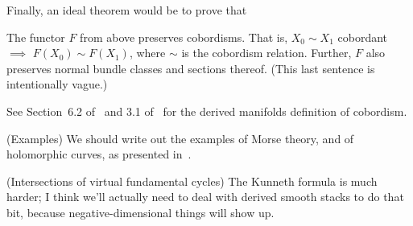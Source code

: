 				\item
					Finally, an ideal theorem would be to prove that 
					\begin{theorem}
						The functor $F$ from above preserves cobordisms. That is, $X_0 \sim X_1$ cobordant $\implies$ $F(X_0) \sim F(X_1)$, where $\sim$ is the cobordism relation. Further, $F$ also preserves normal bundle classes and sections thereof. (This last sentence is intentionally vague.)
					\end{theorem}
					See Section~6.2 of~\cite{spivak-thesis} and 3.1 of~\cite{spivak} for the derived manifolds definition of cobordism.
			\enumd
	\item (Examples)
		We should write out the examples of Morse theory, and of holomorphic curves, as presented in~\cite{pardon}.
	\item (Intersections of virtual fundamental cycles)
		The Kunneth formula is much harder; I think we'll actually need to deal with derived smooth stacks to do that bit, because negative-dimensional things will show up.
		
\enumd



